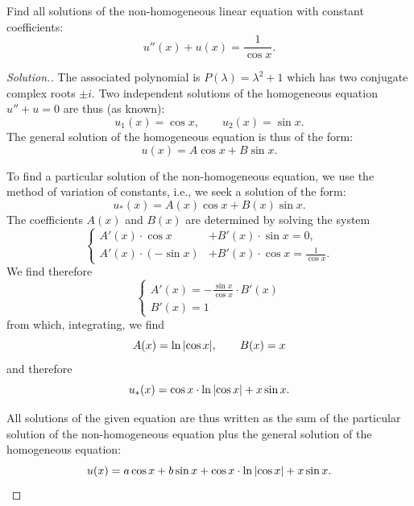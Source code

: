 \begin{exercise}
Find all solutions of the non-homogeneous linear equation with
constant coefficients:
\[
  u''(x) + u(x) = \frac{1}{\cos x}.    
\]
\end{exercise}
\begin{proof}[Solution.]
The associated polynomial is $P(\lambda) = \lambda^2 + 1$ which 
has two conjugate complex roots $\pm i$.
Two independent solutions of the homogeneous equation $u''+u=0$ are thus 
(as known):
\[
 u_1(x) = \cos x, \qquad u_2(x) = \sin x.
\]
The general solution of the homogeneous equation is thus of the form:
\[
  u(x) = A \cos x + B \sin x.  
\]

To find a particular solution of the non-homogeneous equation, 
we use the method of variation of constants, i.e.,
we seek a solution of the form:
\[
  u_*(x) = A(x) \cos x + B(x) \sin x.
\]
The coefficients $A(x)$ and $B(x)$ are determined by solving the system 
\[
\begin{cases}
  A'(x) \cdot \cos x &+ B'(x)\cdot \sin x = 0, \\
  A'(x) \cdot (-\sin x) &+ B'(x)\cdot \cos x = \frac{1}{\cos x}.
\end{cases}  
\]
We find therefore 
\[
 \begin{cases}
  A'(x) = -\frac{\sin x}{\cos x} \cdot B'(x) \\
  B'(x) = 1
 \end{cases}  
\]
from which, integrating, we find
\[
  A(x) = \ln{\left|\cos x\right|}, \qquad B(x) = x
\]
and therefore 
\[
 u_*(x) = \cos x\cdot \ln {\left|\cos x \right|} + x\sin x.  
\]

All solutions of the given equation are thus written as the sum of the 
particular solution of the non-homogeneous equation plus the general solution of
the
homogeneous equation:
\[
 u(x) = a \cos x + b \sin x + \cos x \cdot \ln {\left|\cos x\right|} + x \sin x.  
\]
\end{proof}